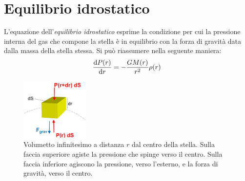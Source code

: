 \section{Equilibrio idrostatico}\label{sec:equilibrio-idrostatico}
L'equazione dell'\emph{equilibrio idrostatico} esprime la condizione per cui la pressione interna del gas che compone la stella è in equilibrio con la forza di gravità data dalla massa della stella stessa. Si può riassumere nella seguente maniera:
\begin{equation}\label{eq:equilibrio-idrostatico}
    \dfrac{\mathop{\mathrm{{}d}}\mathopen{} P(r)}{\mathop{\mathrm{{}d}}\mathopen{} r} = -\dfrac{G M(r)}{r^2} \rho(r)
\end{equation}

\begin{figure}
\centering
\includegraphics[width=0.3\textwidth]{immagini/equilibrio-idrostatico.png}
\caption{Volumetto infinitesimo a distanza $r$ dal centro della stella. Sulla faccia superiore agiste la pressione che spinge verso il centro. Sulla faccia inferiore agiscono la pressione, verso l'esterno, e la forza di gravità, verso il centro.}
\label{fig:equilibrio-idrostatico}
\end{figure}

